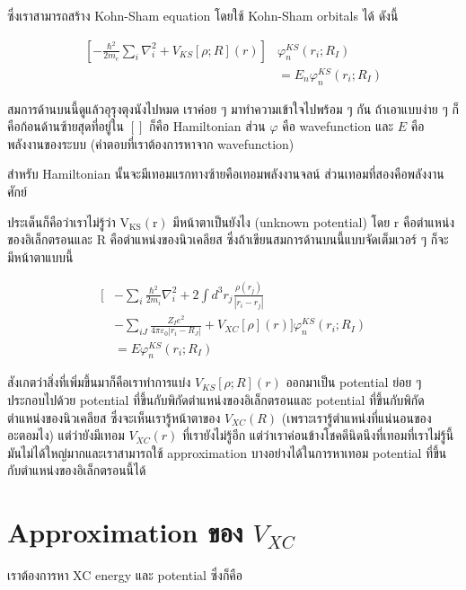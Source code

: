 \noindent ซึ่งเราสามารถสร้าง Kohn-Sham equation โดยใช้ Kohn-Sham orbitals ได้ ดังนี้

\begin{align}
    \left[-\frac{\hbar^2}{2 m_e} \sum_i \nabla_i^2
        + V_{K S}[\rho ; R](r)\right] &
    \varphi_n^{K S}\left(r_i ; R_I\right) \nonumber \\
    &= E_n \varphi_n^{K S}\left(r_i ; R_I\right)
\end{align}

\noindent สมการด้านบนนี้ดูแล้วอุรุงตุงนังไปหมด เราค่อย ๆ มาทำความเข้าใจไปพร้อม ๆ กัน ถ้าเอาแบบง่าย ๆ
ก็คือก้อนด้านซ้ายสุดที่อยู่ใน $[ ]$ ก็คือ Hamiltonian ส่วน $\varphi$ คือ wavefunction และ $E$
คือพลังงานของระบบ (คำตอบที่เราต้องการหาจาก wavefunction)

สำหรับ Hamiltonian นั้นจะมีเทอมแรกทางซ้ายคือเทอมพลังงานจลน์ ส่วนเทอมที่สองคือพลังงานศักย์

ประเด็นก็คือว่าเราไม่รู้ว่า $\mathrm{V}_{\mathrm{KS}}(\mathrm{r})$ มีหน้าตาเป็นยังไง (unknown potential)
โดย $\mathrm{r}$ คือตำแหน่งของอิเล็กตรอนและ $\mathrm{R}$ คือตำแหน่งของนิวเคลียส
ซึ่งถ้าเขียนสมการด้านบนนี้แบบจัดเต็มเวอร์ ๆ ก็จะมีหน้าตาแบบนี้

\begin{align}
    \biggl[ & -\sum_i \frac{\hbar^2}{2 m_i} \nabla_i^2+2 \int d^3 r_j
        \frac{\rho\left(r_j\right)}{\left|r_i-r_j\right|} \nonumber \\
        & -\sum_{i J} \frac{Z_I e^2}{4 \pi \varepsilon_0\left|r_i-R_J\right|}  
        + V_{X C}[\rho](r) \biggr] \varphi_n^{K S}\left(r_i ; R_I\right) \nonumber \\
    & = E \varphi_n^{K S}\left(r_i ; R_I\right)
\end{align}

สังเกตว่าสิ่งที่เพิ่มขึ้นมาก็คือเราทำการแบ่ง $V_{K S}[\rho ; R](r)$ ออกมาเป็น potential ย่อย ๆ
ประกอบไปด้วย potential ที่ขึ้นกับพิกัดตำแหน่งของอิเล็กตรอนและ potential ที่ขึ้นกับพิกัดตำแหน่งของนิวเคลียส 
ซึ่งจะเห็นเรารู้หน้าตาของ $V_{X C}(R)$ (เพราะเรารู้ตำแหน่งที่แน่นอนของอะตอมไง) แต่ว่ายังมีเทอม $V_{X C}(r)$ 
ที่เรายังไม่รู้อีก แต่ว่าเราค่อนข้างโชคดีนิดนึงที่เทอมที่เราไม่รู้นี้มันไม่ได้ใหญ่มากและเราสามารถใช้ approximation 
บางอย่างได้ในการหาเทอม potential ที่ขึ้นกับตำแหน่งของอิเล็กตรอนนี้ได้

\section{Approximation ของ $V_{X C}$}

เราต้องการหา XC energy และ potential ซึ่งก็คือ

